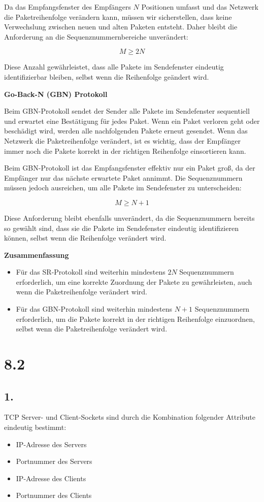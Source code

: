 \documentclass[a4paper]{scrartcl}
\begin{document}
Da das Empfangsfenster des Empfängers $N$ Positionen umfasst und das Netzwerk die Paketreihenfolge verändern kann, müssen wir sicherstellen, dass keine Verwechslung zwischen neuen und alten Paketen entsteht. Daher bleibt die Anforderung an die Sequenznummernbereiche unverändert:

\[
M \geq 2N
\]

Diese Anzahl gewährleistet, dass alle Pakete im Sendefenster eindeutig identifizierbar bleiben, selbst wenn die Reihenfolge geändert wird.

\textbf{Go-Back-N (GBN) Protokoll}

Beim GBN-Protokoll sendet der Sender alle Pakete im Sendefenster sequentiell und erwartet eine Bestätigung für jedes Paket. Wenn ein Paket verloren geht oder beschädigt wird, werden alle nachfolgenden Pakete erneut gesendet. Wenn das Netzwerk die Paketreihenfolge verändert, ist es wichtig, dass der Empfänger immer noch die Pakete korrekt in der richtigen Reihenfolge einsortieren kann.

Beim GBN-Protokoll ist das Empfangsfenster effektiv nur ein Paket groß, da der Empfänger nur das nächste erwartete Paket annimmt. Die Sequenznummern müssen jedoch ausreichen, um alle Pakete im Sendefenster zu unterscheiden:

\[
M \geq N + 1
\]

Diese Anforderung bleibt ebenfalls unverändert, da die Sequenznummern bereits so gewählt sind, dass sie die Pakete im Sendefenster eindeutig identifizieren können, selbst wenn die Reihenfolge verändert wird.

\textbf{Zusammenfassung}

\begin{itemize}
    \item Für das SR-Protokoll sind weiterhin mindestens $2N$ Sequenznummern erforderlich, um eine korrekte Zuordnung der Pakete zu gewährleisten, auch wenn die Paketreihenfolge verändert wird.
    \item Für das GBN-Protokoll sind weiterhin mindestens $N + 1$ Sequenznummern erforderlich, um die Pakete korrekt in der richtigen Reihenfolge einzuordnen, selbst wenn die Paketreihenfolge verändert wird.
\end{itemize}

\section*{8.2}

\subsection*{1.}
TCP Server- und Client-Sockets sind durch die Kombination folgender Attribute eindeutig bestimmt:
\begin{itemize}
    \item IP-Adresse des Servers
    \item Portnummer des Servers
    \item IP-Adresse des Clients
    \item Portnummer des Clients
\end{itemize}
\end{document}
